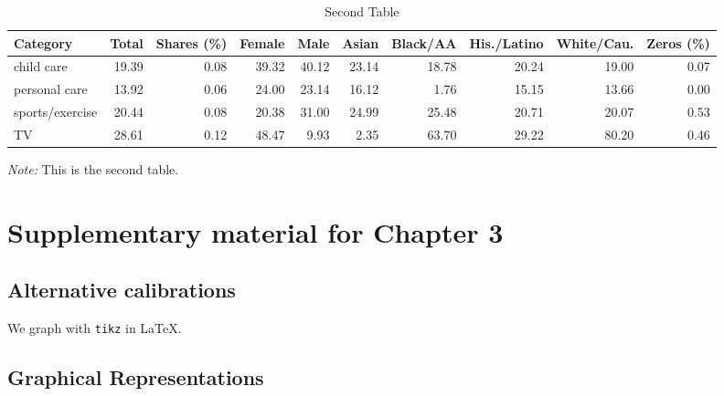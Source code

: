 \documentclass[letterpaper]{report}
\begin{document}
\begin{appendices}
  \renewcommand*\arraystretch{0.95}
  \renewcommand{\tabcolsep}{7.5pt}
  \begin{table}[H]
    \addtocounter{table}{-1}
    \renewcommand{\thetable}{B.\arabic{table}b}
    \caption{Second Table}
    \label{summary_b}
    \fontsize{9}{11}\selectfont
    \hspace*{-0.5cm}
    \begin{tabular}{lrrrrrrrrr}
      \toprule
      Category                   & Total & Shares (\%) & Female & Male  & Asian & Black/AA & His./Latino & White/Cau. & Zeros (\%) \\ \hline
      child care                 & 19.39 & 0.08   & 39.32  & 40.12 & 23.14 & 18.78    & 20.24       & 19.00      & 0.07  \\
      personal care              & 13.92 & 0.06   & 24.00  & 23.14 & 16.12 & 1.76    & 15.15       & 13.66      & 0.00  \\
      sports/exercise            & 20.44 & 0.08   & 20.38  & 31.00 & 24.99 & 25.48    & 20.71       & 20.07      & 0.53  \\
      TV                         & 28.61 & 0.12   & 48.47  & 9.93 & 2.35 & 63.70    & 29.22       & 80.20      & 0.46  \\ \bottomrule
    \end{tabular}
    \hspace*{-1cm}
    \begin{minipage}{1.065\textwidth}
      \onehalfspacing
      \vspace*{0.05cm}
      \begin{tablenotes}
        \footnotesize
        \item\textit{Note:} This is the second table.
      \end{tablenotes}
    \end{minipage}
  \end{table}
  
  \chapter{Supplementary material for Chapter 3}
  
  \section{Alternative calibrations}
  
  We graph with \texttt{tikz} in \LaTeX. \lipsum[77]
  
  \section{Graphical Representations}
  

\end{appendices}
\end{document}
